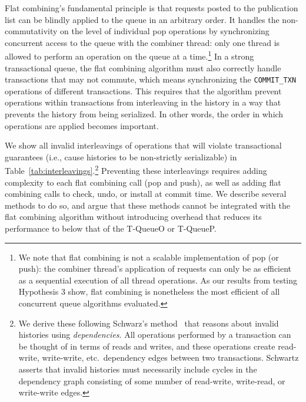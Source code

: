 Flat combining's fundamental principle is that requests posted to the publication list can be blindly applied to the queue in an arbitrary order. It handles the non-commutativity on the level of individual pop operations by synchronizing concurrent access to the queue with the combiner thread: only one thread is allowed to perform an operation on the queue at a time.\footnote{We note that flat combining is not a scalable implementation of pop (or push): the combiner thread's application of requests can only be as efficient as a sequential execution of all thread operations. As our results from testing Hypothesis 3 show, flat combining is nonetheless the most efficient of all concurrent queue algorithms evaluated.}
In a strong transactional queue, the flat combining algorithm must also correctly handle transactions that may not commute, which means synchronizing the \texttt{COMMIT\_TXN} operations of different transactions. This requires that the algorithm prevent operations within transactions from interleaving in the history in a way that prevents the history from being serialized. In other words, the order in which operations are applied becomes important.

We show all invalid interleavings of operations that will violate transactional guarantees (i.e., cause histories to be non-strictly serializable) in Table~\ref{tab:interleavings}.\footnote{We derive these following Schwarz's method~\cite{schwarz} that reasons about invalid histories using \emph{dependencies}. All operations performed by a transaction can be thought of in terms of reads and writes, and these operations create read-write, write-write, etc.\ dependency edges between two transactions. Schwartz asserts that invalid histories must necessarily include cycles in the dependency graph consisting of some number of read-write, write-read, or write-write edges.}
Preventing these interleavings requires adding complexity to each flat combining call (pop and push), as well as adding flat combining calls to check, undo, or install at commit time. We describe several methods to do so, and argue that these methods cannot be integrated with the flat combining algorithm without introducing overhead that reduces its performance to below that of the T-QueueO or T-QueueP. 

